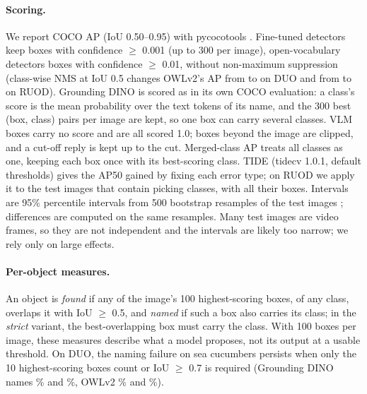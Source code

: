 \documentclass[letterpaper]{article} %
\begin{document}
\paragraph{Scoring.}
We report COCO AP (IoU 0.50--0.95) with pycocotools \citep{lin2014coco}. Fine-tuned detectors keep boxes with confidence $\geq$ 0.001 (up to 300 per image), open-vocabulary detectors boxes with confidence $\geq$ 0.01, without non-maximum suppression (class-wise NMS at IoU 0.5 changes OWLv2's AP from \owlApDuo{} to \owlNmsDuo{} on DUO and from \owlApRuod{} to \owlNmsRuod{} on RUOD). Grounding DINO is scored as in its own COCO evaluation: a class's score is the mean probability over the text tokens of its name, and the 300 best (box, class) pairs per image are kept, so one box can carry several classes. VLM boxes carry no score and are all scored 1.0; boxes beyond the image are clipped, and a cut-off reply is kept up to the cut. Merged-class AP treats all classes as one, keeping each box once with its best-scoring class. TIDE \citep{bolya2020tide} (tidecv 1.0.1, default thresholds) gives the AP50 gained by fixing each error type; on RUOD we apply it to the \tideRuodImages{} test images that contain picking classes, with all their boxes. Intervals are 95\% percentile intervals from 500 bootstrap resamples of the test images \citep{efron1994introduction}; differences are computed on the same resamples. Many test images are video frames, so they are not independent and the intervals are likely too narrow; we rely only on large effects.

\paragraph{Per-object measures.}
An object is \emph{found} if any of the image's 100 highest-scoring boxes, of any class, overlaps it with IoU $\geq$ 0.5, and \emph{named} if such a box also carries its class; in the \emph{strict} variant, the best-overlapping box must carry the class. With 100 boxes per image, these measures describe what a model proposes, not its output at a usable threshold. On DUO, the naming failure on sea cucumbers persists when only the 10 highest-scoring boxes count or IoU $\geq$ 0.7 is required (Grounding DINO names \scNamedTopTenGD\% and \scNamedIouSeventyGD\%, OWLv2 \scNamedTopTenOWL\% and \scNamedIouSeventyOWL\%).
\end{document}
